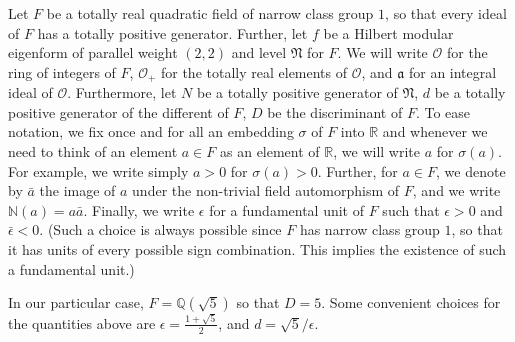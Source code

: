 \documentclass{article}
\theoremstyle{plain}
\begin{document}
Let $F$ be a totally real quadratic field of narrow class group $1$, so that every ideal of $F$ has a totally positive generator. Further, let $f$ be a Hilbert modular eigenform of parallel weight $(2,2)$ and level $\mathfrak{N}$ for $F$. We will write $\mathcal{O}$ for the ring of integers of $F$, $\mathcal{O}_+$ for the totally real elements of $\mathcal{O}$, and $\mathfrak{a}$ for an integral ideal of $\mathcal{O}$. Furthermore, let $N$ be a totally positive generator of $\mathfrak{N}$, $d$ be a totally positive generator of the different of $F$, $D$ be the discriminant of $F$. To ease notation, we fix once and for all an embedding $\sigma$ of $F$ into $\mathbb{R}$ and whenever we need to think of an element $a \in F$ as an element of $\mathbb{R}$, we will write $a$ for $\sigma(a)$. For example, we write simply $a >0$ for $\sigma(a)>0$.  Further, for $a \in F$, we denote by $\bar{a}$ the image of $a$ under the non-trivial field automorphism of $F$, and we write $\mathbb{N}(a)=a\bar{a}$. Finally, we write $\epsilon$ for a fundamental unit of $F$ such that $\epsilon>0$ and $\bar{\epsilon}<0$. (Such a choice is always possible since $F$ has narrow class group $1$, so that it has units of every possible sign combination. This implies the existence of such a fundamental unit.)

In our particular case, $F=\mathbb{Q}(\sqrt{5})$ so that $D=5$. Some convenient choices for the quantities above are $\epsilon=\frac{1+\sqrt{5}}{2}$, and $d=\sqrt{5}/\epsilon$.
\end{document}
